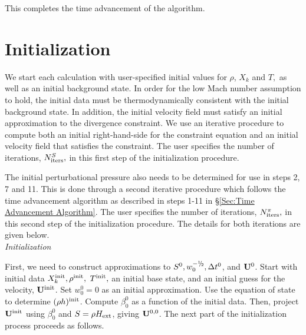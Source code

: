 \noindent This completes the time advancement of the algorithm.




\section{Initialization}\label{Sec:Initialization}

We start each calculation with user-specified initial values for
$\rho$, $X_k$ and $T,$ as well as an initial background state.  In
order for the low Mach number assumption to hold, the initial data
must be thermodynamically consistent with the initial background
state.  In addition, the initial velocity field must satisfy an
initial approximation to the divergence constraint.  We use an iterative
procedure to compute both an initial right-hand-side for the
constraint equation and an initial velocity field that satisfies
the constraint.  The user specifies the number of iterations,
$N_{\rm iters}^{S},$ in this first step of the initialization procedure.

The initial perturbational pressure also needs to be determined for
use in steps 2, 7 and 11. 
This is done through a second iterative procedure which follows the
time advancement algorithm as described in steps 1-11 in 
\S \ref{Sec:Time Advancement Algorithm}.  
The user specifies the number of iterations, 
$N_{\rm iters}^{\pi},$ in this second step of the initialization procedure.
The details for both iterations are given below.\\

 {\em Initialization}

First, we need to construct approximations to $S^0, w_0^{-\myhalf}, \Delta t^0$, 
and ${\bf U}^0$.  Start with initial data $X_k^{\mathrm{init}}, \rho^{\mathrm{init}},$ $T^{\mathrm{init}},$ an 
initial base state, and an initial guess for the velocity, ${\bf U}^{\mathrm{init}}$.
Set $w_0^0 = 0$ as an initial approximation.  Use the equation of state to 
determine $(\rho h)^{\mathrm{init}}$.  Compute $\beta_0^0$ as a function of 
the initial data.  Then, project ${\bf U}^{\mathrm{init}}$ using $\beta_0^0$ and 
$S = \rho{H_{\rm ext}}$, giving ${\bf U}^{0,0}$.  The next part of the initialization process 
proceeds as follows.

